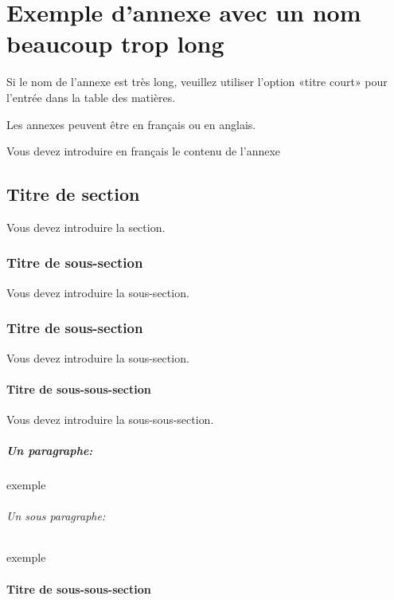 \chapter[Titre cours d'une annexe]{Exemple d'annexe avec un nom beaucoup trop long}
\label{app:exemple}

Si le nom de l'annexe est très long, veuillez utiliser l'option «titre court» pour l'entrée dans la table des matières.

Les annexes peuvent \^etre en fran\c{c}ais ou en anglais. 


Vous devez introduire en français le contenu de l'annexe

\modeAnglais

\section{Titre de section}

Vous devez introduire la section.

\subsection{Titre de sous-section}

Vous devez introduire la  sous-section.

\subsection{Titre de sous-section}

Vous devez introduire la  sous-section.

\subsubsection{Titre de sous-sous-section}

Vous devez introduire la  sous-sous-section.

\paragraph{Un paragraphe:} exemple

\subparagraph{Un sous paragraphe:} exemple

\subsubsection{Titre de sous-sous-section}

